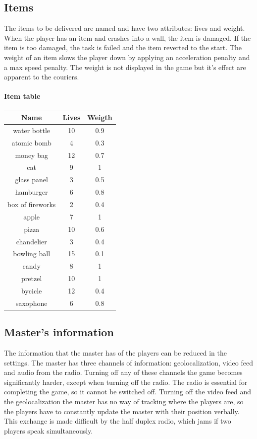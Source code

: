 \documentclass[12pt]{article}
\begin{document}
\subsection{Items}
The items to be delivered are named and have two attributes: lives and weight. When the player has an item and crashes into a wall, the item is damaged. If the item is too damaged, the task is failed and the item reverted to the start. The weight of an item slows the player down by applying an acceleration penalty and a max speed penalty. The weight is not displayed in the game but it's effect are apparent to the couriers.

\paragraph{Item table}

\begin{center}
\begin{tabular}{ |c|c|c| } 
 \hline
 Name & Lives & Weigth \\ 
\hline
water bottle & 10 & 0.9\\
atomic bomb & 4 & 0.3\\
money bag & 12 & 0.7\\
cat & 9 & 1\\
glass panel & 3 & 0.5\\
hamburger & 6 & 0.8\\
box of fireworks & 2 & 0.4\\
apple & 7 & 1\\
pizza & 10 & 0.6\\
chandelier & 3 & 0.4\\
bowling ball & 15 & 0.1\\
candy & 8 & 1\\
pretzel & 10 & 1\\
bycicle & 12 & 0.4\\
saxophone & 6 & 0.8\\
 \hline
\end{tabular}
\end{center}

\subsection{Master's information}
The information that the master has of the players can be reduced in the settings. The master has three channels of information: geolocalization, video feed and audio from the radio. Turning off any of these channels the game becomes significantly harder, except when turning off the radio. The radio is essential for completing the game, so it cannot be switched off. Turning off the video feed and the geolocalization the master has no way of tracking where the players are, so the players have to constantly update the master with their position verbally. This exchange is made difficult by the half duplex radio, which jams if two players speak simultaneously.
\end{document}
